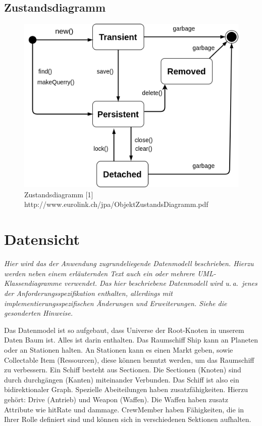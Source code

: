 \documentclass[fontsize=12pt,paper=a4,twoside]{scrartcl}
\begin{document}
\subsection{Zustandsdiagramm}
\begin{figure}[htp]
	\centering
	\includegraphics[width=0.9\linewidth]{pics/Zustandsdiagramm.png}
	\caption{Zustandsdiagramm [1] http://www.eurolink.ch/jpa/ObjektZustandsDiagramm.pdf}
	\label{fig4}
	
\end{figure}

\section{Datensicht} \label{sec:datensicht}

{\itshape Hier wird das der Anwendung zugrundeliegende Datenmodell beschrieben. 
Hierzu werden neben einem erläuternden Text auch ein oder mehrere 
{UML}-Klassendiagramme verwendet. Das hier beschriebene Datenmodell wird u.\,a.\ 
jenes der Anforderungsspezifikation enthalten, allerdings mit 
implementierungsspezifischen Änderungen und Erweiterungen. Siehe die gesonderten
Hinweise.}


Das Datenmodel ist so aufgebaut, dass Universe der Root-Knoten in unserem Daten Baum ist. Alles ist darin enthalten. Das Raumschiff
Ship kann an Planeten oder an Stationen halten. An Stationen kann es einen Markt geben, sowie Collectable Item (Ressourcen), diese können benutzt werden, um das Raumschiff zu verbessern.
Ein Schiff besteht aus Sectionen. Die Sectionen (Knoten) sind durch durchgängen  (Kanten) miteinander Verbunden. Das Schiff ist also ein bidirektionaler Graph. Spezielle Abeiteilungen haben zusatzfähigkeiten. Hierzu gehört: Drive (Antrieb) und Weapon (Waffen). Die Waffen haben zusatz Attribute wie hitRate und dammage.
CrewMember haben Fähigkeiten, die in Ihrer Rolle definiert sind und können sich in verschiedenen Sektionen aufhalten.
\end{document}
